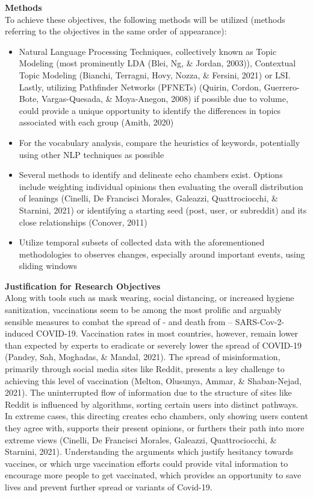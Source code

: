 \documentclass{article}
\begin{document}
    {\raggedleft\textbf{Methods}} \\
    To achieve these objectives, the following methods will be utilized (methods referring to the objectives in the same order of appearance): \\
    \begin{itemize}
        \item Natural Language Processing Techniques, collectively known as Topic Modeling (most prominently LDA (Blei, Ng, \& Jordan, 2003)), Contextual Topic Modeling (Bianchi, Terragni, Hovy, Nozza, \& Fersini, 2021) or LSI. Lastly, utilizing Pathfinder Networks (PFNETs) (Quirin, Cordon, Guerrero-Bote, Vargas-Quesada, \& Moya-Anegon, 2008) if possible due to volume, could provide a unique opportunity to identify the differences in topics associated with each group (Amith, 2020)
        \item For the vocabulary analysis, compare the heuristics of keywords, potentially using other NLP techniques as possible 
        \item Several methods to identify and delineate echo chambers exist. Options include weighting individual opinions then evaluating the overall distribution of leanings (Cinelli, De Francisci Morales, Galeazzi, Quattrociocchi, \& Starnini, 2021) or identifying a starting seed (post, user, or subreddit) and its close relationships (Conover, 2011)
        \item Utilize temporal subsets of collected data with the aforementioned methodologies to observes changes, especially around important events, using sliding windows
    \end{itemize}

    {\raggedleft\textbf{Justification for Research Objectives}} \\
    Along with tools such as mask wearing, social distancing, or increased hygiene sanitization, vaccinations seem to be among the most prolific and arguably sensible measures to combat the spread of - and death from – SARS-Cov-2-induced COVID-19. 
    Vaccination rates in most countries, however, remain lower than expected by experts to eradicate or severely lower the spread of COVID-19 (Pandey, Sah, Moghadas, \& Mandal, 2021).
    The spread of misinformation, primarily through social media sites like Reddit, presents a key challenge to achieving this level of vaccination (Melton, Olusunya, Ammar, \& Shaban-Nejad, 2021). 
    The uninterrupted flow of information due to the structure of sites like Reddit is influenced by algorithms, sorting certain users into distinct pathways. In extreme cases, this directing creates echo chambers, only showing users content they agree with, supports their present opinions, or furthers their path into more extreme views (Cinelli, De Francisci Morales, Galeazzi, Quattrociocchi, \& Starnini, 2021).
    Understanding the arguments which justify hesitancy towards vaccines, or which urge vaccination efforts could provide vital information to encourage more people to get vaccinated, which provides an opportunity to save lives and prevent further spread or variants of Covid-19. \\ \\ \\
\end{document}
